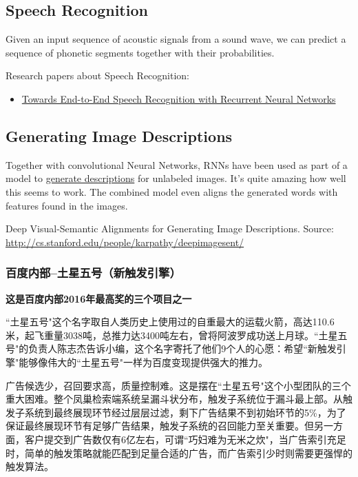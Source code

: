 \subsection{Speech Recognition}
Given an input sequence of acoustic signals from a sound wave, we can predict a sequence of phonetic segments together with their probabilities.

Research papers about Speech Recognition:
\begin{itemize}
\item \href{http://www.jmlr.org/proceedings/papers/v32/graves14.pdf}{Towards End-to-End Speech Recognition with Recurrent Neural Networks}
\end{itemize}


\subsection{Generating Image Descriptions}
Together with convolutional Neural Networks, RNNs have been used as part of a model to \href{http://cs.stanford.edu/people/karpathy/deepimagesent/}{generate descriptions} for unlabeled images. It's quite amazing how well this seems to work. The combined model even aligns the generated words with features found in the images.

Deep Visual-Semantic Alignments for Generating Image Descriptions.
Source: \url{http://cs.stanford.edu/people/karpathy/deepimagesent/}


\subsubsection{百度内部--土星五号（新触发引擎）}
\textbf{这是百度内部2016年最高奖的三个项目之一}

``土星五号"这个名字取自人类历史上使用过的自重最大的运载火箭，高达110.6米，起飞重量3038吨，总推力达3400吨左右，曾将阿波罗成功送上月球。``土星五号"的负责人陈志杰告诉小编，这个名字寄托了他们9个人的心愿：希望``新触发引擎"能够像伟大的``土星五号"一样为百度变现提供强大的推力。

广告候选少，召回要求高，质量控制难。这是摆在``土星五号"这个小型团队的三个重大困难。整个凤巢检索端系统呈漏斗状分布，触发子系统位于漏斗最上部。从触发子系统到最终展现环节经过层层过滤，剩下广告结果不到初始环节的5\%，为了保证最终展现环节有足够广告结果，触发子系统的召回能力至关重要。但另一方面，客户提交到广告数仅有6亿左右，可谓``巧妇难为无米之炊"，当广告索引充足时，简单的触发策略就能匹配到足量合适的广告，而广告索引少时则需要更强悍的触发算法。

